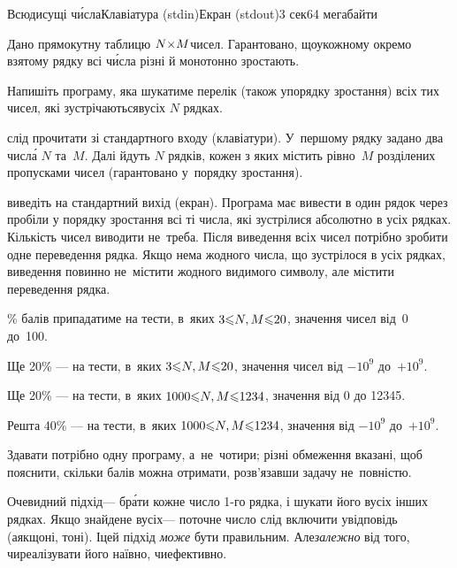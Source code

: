 \documentclass[14pt,a4paper]{extarticle}
\begin{document}
\begin{problem}{Всюдисущі ч\'{и}сла}{Клавіатура (stdin)}{Екран (stdout)}{3 сек}{64 мегабайти}\label{sec:omnipresent-numbers}

Дано прямокутну таблицю $N{\times}M$\nolinebreak[3] чисел. Гарантовано, що\nolinebreak[2] у\nolinebreak[3] кожному окремо взятому рядку всі ч\'{и}сла різні й монотонно зростають.

Напишіть програму, яка шукатиме перелік (також у\nolinebreak[3] порядку зростання) всіх тих чисел, які зустрічаються\linebreak[1] в\nolinebreak[3] усіх $N$ рядках.

\InputFile	слід прочитати зі стандартного входу (клавіатури). У~першому рядку задано два числ\'{а} $N$ та~$M$. Далі йдуть $N$ рядків, кожен з яких містить рівно~$M$ розділених пропусками чисел (гарантовано у~порядку зростання). 

\OutputFile	виведіть на стандартний вихід (екран). Програма має вивести в один рядок через пробіли у порядку зростання всі ті числа, які зустрілися абсолютно в усіх рядках. Кількість чисел виводити не~треба. Після виведення всіх чисел потрібно зробити одне переведення рядка. Якщо нема жодного числа, що зустрілося в усіх рядках, виведення повинно не~містити жодного видимого символу, але містити переведення рядка.


\Example
\begin{exampleSimple}{6em}{3em}%
%
\end{exampleSimple}

\% балів припадатиме на тести, в~яких $3{\leqslant}{N,M}{\leqslant}20$, значення чисел від~0 до~100.

Ще 20\% --- на тести, в~яких $3{\leqslant}{N,M}{\leqslant}20$, значення чисел від $-10^9$ до~$+10^9$.

Ще 20\% --- на тести, в~яких $1000{\leqslant}{N,M}{\leqslant}1234$, значення від 0 до 12345.

Решта 40\% --- на тести, в~яких $1000{\leqslant}{N,M}{\leqslant}1234$, значення від $-10^9$ до~$+10^9$.

Здавати потрібно одну програму, а~не~чотири; різні обмеження вказані, щоб пояснити, скільки балів можна отримати, розв’язавши задачу не~повністю.


\end{problem}
	

\Tutorial	
Очевидний підхід\nolinebreak[3] --- бр\'{а}ти кожне число \mbox{1-го} рядка, і шукати його в\nolinebreak[3] усіх інших рядках. Якщо знайдене в\nolinebreak[3] усіх\nolinebreak[3] --- поточне число слід включити у\nolinebreak[3] відповідь (а\nolinebreak[3] якщо\nolinebreak[2] ні, то\nolinebreak[3] ні).
І\nolinebreak[3] цей підхід \emph{може} бути правильним. Але\nolinebreak[2] \emph{залежно} від того, чи\nolinebreak[3] реалізувати його наївно, чи\nolinebreak[3] ефективно. 
\end{document}
